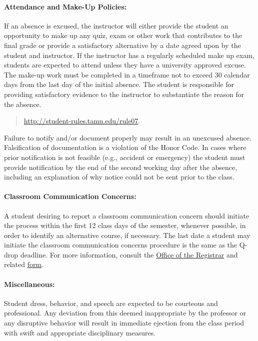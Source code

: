 \documentclass{article}
\begin{document}
\paragraph{Attendance and Make-Up Policies:}
If an absence is excused, the instructor will either provide the student an opportunity to make up any quiz, exam or other work that contributes to the final grade or provide a satisfactory alternative by a date agreed upon by the student and instructor.
If the instructor has a regularly scheduled make up exam, students are expected to attend unless they have a university approved excuse.
The make-up work must be completed in a timeframe not to exceed 30 calendar days from the last day of the initial absence. 
The student is responsible for providing satisfactory evidence to the instructor to substantiate the reason for the absence.
\begin{quote}
\url{http://student-rules.tamu.edu/rule07}.
\end{quote}
Failure to notify and/or document properly may result in an unexcused absence.
Falsification of documentation is a violation of the Honor Code. 
In cases where prior notification is not feasible (e.g., accident or emergency) the student must provide notification by the end of the second working day after the absence, including an explanation of why notice could not be sent prior to the class. 


%
\paragraph{Classroom Communication Concerns:}
A student desiring to report a classroom communication concern should initiate the process within the first 12 class days of the semester, whenever possible, in order to identify an alternative course, if necessary.
The last date a student may initiate the classroom communication concerns procedure is the same as the Q-drop deadline.
For more information, consult the \href{http://registrar.tamu.edu/}{Office of the Registrar} and related \href{http://registrar.tamu.edu/Registrar/media/REGI_Forms/UGClsrmCommConcern.pdf}{form}.


\paragraph{Miscellaneous:}
Student dress, behavior, and speech are expected to be courteous and professional.
Any deviation from this deemed inappropriate by the professor or any disruptive behavior will result in immediate ejection from the class period with swift and appropriate disciplinary measures.
\end{document}
